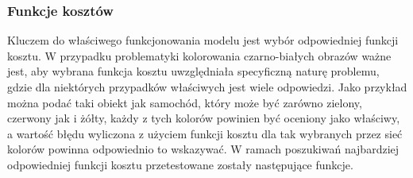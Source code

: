 
  \subsubsection{Funkcje kosztów}
  Kluczem do właściwego funkcjonowania modelu jest wybór odpowiedniej funkcji
  kosztu. W przypadku problematyki kolorowania czarno-białych obrazów ważne
  jest, aby wybrana funkcja kosztu uwzględniała specyficzną naturę problemu,
  gdzie dla niektórych przypadków właściwych jest wiele odpowiedzi. Jako
  przykład można podać taki obiekt jak samochód, który może być zarówno
  zielony, czerwony jak i żółty, każdy z tych kolorów powinien być oceniony
  jako właściwy, a wartość błędu wyliczona z użyciem funkcji kosztu dla tak
  wybranych przez sieć kolorów powinna odpowiednio to wskazywać. W ramach
  poszukiwań najbardziej odpowiedniej funkcji kosztu przetestowane zostały
  następujące funkcje.

